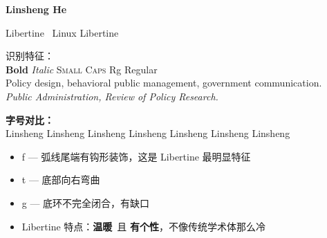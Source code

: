 \documentclass[11pt, a4paper]{article}
\begin{document}
{\fontsize{24pt}{30pt}\selectfont\bfseries Linsheng He}

\vspace{6pt}
{\LARGE Libertine \textbullet\ Linux Libertine}

\vspace{12pt}
{\footnotesize 识别特征：}\\[2pt]
{\large \textbf{Bold} \textit{Italic} \textsc{Small Caps} Rg Regular}\\[4pt]
{\large Policy design, behavioral public management, government communication.}\\[4pt]
{\large\itshape Public Administration, Review of Policy Research.}

\vspace{16pt}
{\footnotesize\bfseries 字号对比：}\\[2pt]
{\tiny Linsheng} {\scriptsize Linsheng} {\footnotesize Linsheng} {\small Linsheng}
Linsheng {\large Linsheng} {\Large Linsheng}

\vspace{12pt}
\begin{itemize}
    \item f --- 弧线尾端有钩形装饰，这是 Libertine 最明显特征
    \item t --- 底部向右弯曲
    \item g --- 底环不完全闭合，有缺口
    \item Libertine 特点：\textbf{温暖}\ 且 \textbf{有个性}，不像传统学术体那么冷
\end{itemize}
\end{document}
